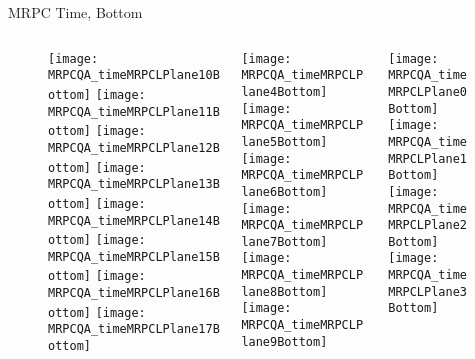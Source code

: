 \documentclass[11pt]{beamer}
\begin{document}
\begin{frame}{MRPC Time, Bottom}
  \begin{figure}
    \begin{columns}
      \begin{column}{.33\textheight}
        \texttt{[image: MRPCQA\_timeMRPCLPlane10Bottom]}
        \texttt{[image: MRPCQA\_timeMRPCLPlane11Bottom]}
        \texttt{[image: MRPCQA\_timeMRPCLPlane12Bottom]}
        \texttt{[image: MRPCQA\_timeMRPCLPlane13Bottom]}
        \texttt{[image: MRPCQA\_timeMRPCLPlane14Bottom]}
        \texttt{[image: MRPCQA\_timeMRPCLPlane15Bottom]}
        \texttt{[image: MRPCQA\_timeMRPCLPlane16Bottom]}
        \texttt{[image: MRPCQA\_timeMRPCLPlane17Bottom]}
      \end{column}
      \begin{column}{.33\textheight}
        \texttt{[image: MRPCQA\_timeMRPCLPlane4Bottom]}
        \texttt{[image: MRPCQA\_timeMRPCLPlane5Bottom]}
        \texttt{[image: MRPCQA\_timeMRPCLPlane6Bottom]}
        \texttt{[image: MRPCQA\_timeMRPCLPlane7Bottom]}
        \texttt{[image: MRPCQA\_timeMRPCLPlane8Bottom]}
        \texttt{[image: MRPCQA\_timeMRPCLPlane9Bottom]}
      \end{column}
      \begin{column}{.33\textheight}
        \texttt{[image: MRPCQA\_timeMRPCLPlane0Bottom]}
        \texttt{[image: MRPCQA\_timeMRPCLPlane1Bottom]}
        \texttt{[image: MRPCQA\_timeMRPCLPlane2Bottom]}
        \texttt{[image: MRPCQA\_timeMRPCLPlane3Bottom]}
      \end{column}
    \end{columns}
  \end{figure}
\end{frame}
\end{document}
